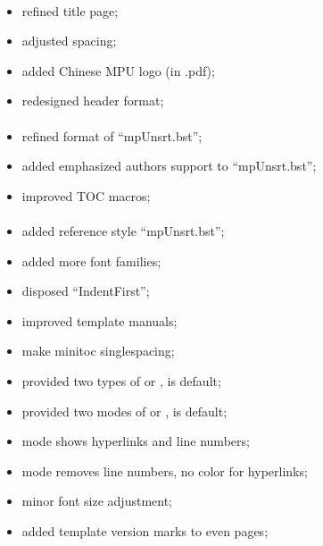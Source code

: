 \paragraph{}
	\begin{itemize}[noitemsep]
		\item refined title page;
		\item adjusted spacing;
		\item added Chinese MPU logo (in .pdf);
		\item redesigned header format;
	\end{itemize}

\paragraph{}
	\begin{itemize}[noitemsep]
		\item refined format of ``mpUnsrt.bst'';
		\item added emphasized authors support to ``mpUnsrt.bst'';
		\item improved TOC macros;
	\end{itemize}

\paragraph{}
	\begin{itemize}[noitemsep]
		\item added reference style ``mpUnsrt.bst'';
		\item added more font families;
		\item disposed ``IndentFirst'';
		\item improved template manuals;
		\item make minitoc singlespacing;
		\item provided two types of  or ,  is default;
		\item provided two modes of  or ,  is default;
		\item {} mode shows hyperlinks and line numbers;
		\item {} mode removes line numbers, no color for hyperlinks;
		\item minor font size adjustment;
		\item added template version marks to even pages;
	\end{itemize}

